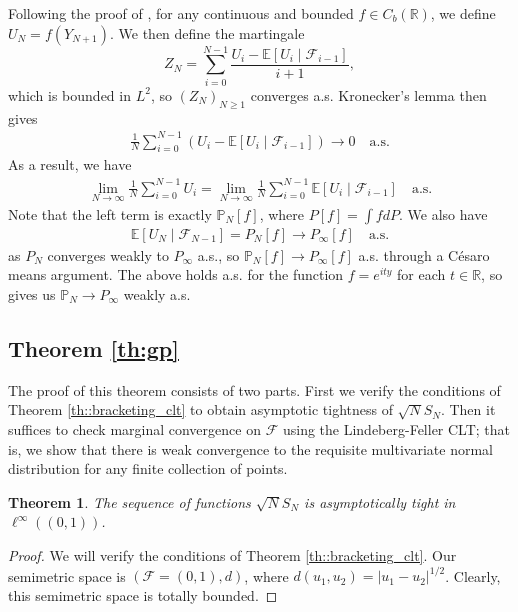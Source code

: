 \documentclass[11pt,a4paper]{article}
\newtheorem{thm}{Theorem}
\newcommand{\E}{\mathbb{E}}
\begin{document}
\begin{appendices}
Following the proof of \cite[Theorem 2.2]{Berti2004}, for any continuous and bounded $f \in C_b(\mathbb{R})$, we define $U_N = f(Y_{N+1})$.
We then define the martingale 
$$Z_N = \sum_{i=0}^{N-1}\frac{U_i - \E[U_i \mid \mathcal{F}_{i-1}]}{i+1},$$
which is bounded in $L^2$, so $(Z_N)_{N \geq 1}$ converges a.s. Kronecker's lemma then gives
\begin{align*}
     \frac{1}{N}\sum_{i=0}^{N-1}\left(U_i - \E[U_i \mid \mathcal{F}_{i-1}]\right) \to 0 \quad \text{a.s.}
\end{align*}
As a result, we have
\begin{align*}
    \lim_{N \to \infty}\frac{1}{N}\sum_{i=0}^{N-1}U_i =   \lim_{N \to \infty}\frac{1}{N}\sum_{i=0}^{N-1}\E[U_i \mid \mathcal{F}_{i-1}] \quad \text{a.s.}
\end{align*}
 Note that the left term is exactly $\mathbb{P}_N[f]$, where $P[f] = \int f dP$. We also have
\begin{align*}
    \E[U_N \mid \mathcal{F}_{N-1}] = P_N[f] \to  P_\infty [f] \quad \text{a.s.}
\end{align*}
as $P_N$ converges weakly to $P_\infty$ a.s., so $\mathbb{P}_N[f] \to P_\infty[f]$ a.s. through a C\'{e}saro means argument. The above holds a.s. for the function $f = e^{ity}$ for each $t \in \mathbb{R}$, so \citet[Theorem 2.6]{Berti2006} gives us $\mathbb{P}_N \to P_\infty$ weakly a.s.  


\subsection{Theorem \ref{th:gp}}
The proof of this theorem consists of two parts. First we verify the conditions of {Theorem \ref{th::bracketing_clt}} to obtain asymptotic tightness of $\sqrt{N}S_{N}$. Then it suffices to check marginal convergence on $\mathcal{F}$ using the Lindeberg-Feller CLT; that is, we show that there is weak convergence to the requisite multivariate normal distribution for any finite collection of points. 

\begin{thm}\label{th:tight}
The sequence of functions $\sqrt{N}S_N$ is  asymptotically tight in $\ell^{\infty}((0,1))$.
\end{thm}
\begin{proof}
We will verify the conditions of {Theorem \ref{th::bracketing_clt}}. Our semimetric space is $(\mathcal{F} = (0,1), d)$, where $d(u_{1},u_{2}) = |u_{1}-u_{2}|^{1/2}$. Clearly, this semimetric space is totally bounded.


\end{proof}
\end{appendices}
\end{document}
